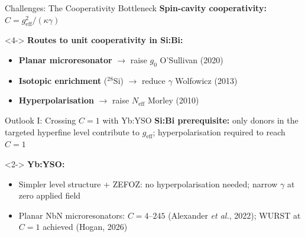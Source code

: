 \documentclass[10pt]{beamer}
\begin{document}
\begin{frame}{Challenges: The Cooperativity Bottleneck}
    \textbf{Spin-cavity cooperativity:} $C = g_\mathrm{eff}^2 / (\kappa\gamma)$



    \vspace{0.15cm}
    \begin{uncoverenv}<4->
    \textbf{Routes to unit cooperativity in Si:Bi:}
    \begin{itemize}
        \setlength{\itemsep}{4pt}
        \item \textbf{Planar microresonator} $\to$ raise $g_0$ \hfill {\scriptsize O'Sullivan (2020)}
        \item \textbf{Isotopic enrichment} ($^{28}$Si) $\to$ reduce $\gamma$ \hfill {\scriptsize Wolfowicz (2013)}
        \item \textbf{Hyperpolarisation} $\to$ raise $N_\mathrm{eff}$ \hfill {\scriptsize Morley (2010)}
    \end{itemize}
    \end{uncoverenv}

\end{frame}

\begin{frame}{Outlook I: Crossing $C=1$ with Yb:YSO}
    \textbf{Si:Bi prerequisite:} only donors in the targeted hyperfine level contribute to $g_\mathrm{eff}$; hyperpolarisation required to reach $C=1$

    \vspace{0.2cm}
    \begin{uncoverenv}<2->
    \textbf{Yb:YSO:}
    \begin{itemize}
        \item Simpler level structure + ZEFOZ: no hyperpolarisation needed; narrow $\gamma$ at zero applied field
        \item Planar NbN microresonators: $C=4$--$245$ (Alexander \textit{et al.}, 2022); WURST at $C=1$ achieved (Hogan, 2026)
    \end{itemize}
    \end{uncoverenv}

    \vspace{0.15cm}
\end{frame}
\end{document}
